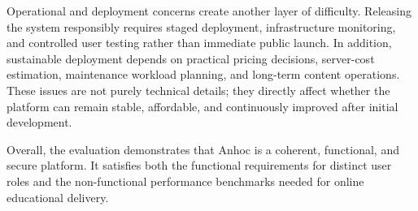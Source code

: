 Operational and deployment concerns create another layer of difficulty. Releasing the system responsibly requires staged deployment, infrastructure monitoring, and controlled user testing rather than immediate public launch. In addition, sustainable deployment depends on practical pricing decisions, server-cost estimation, maintenance workload planning, and long-term content operations. These issues are not purely technical details; they directly affect whether the platform can remain stable, affordable, and continuously improved after initial development.

Overall, the evaluation demonstrates that Anhoc is a coherent, functional, and secure platform. It satisfies both the functional requirements for distinct user roles and the non-functional performance benchmarks needed for online educational delivery.
